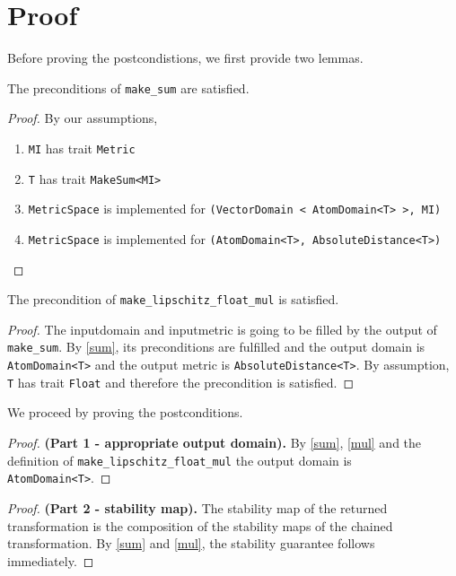\documentclass{article}
\begin{document}
\section{Proof}
Before proving the postcondistions, we first provide two lemmas.
\begin{lemma} \label{sum}
The preconditions of \texttt{make\_sum} are satisfied.
\end{lemma}
\begin{proof}
    By our assumptions,
    \begin{enumerate}
        \item \texttt{MI} has trait \texttt{Metric}
        \item \texttt{T} has trait \texttt{MakeSum<MI>}
        \item \texttt{MetricSpace} is implemented for \texttt{(VectorDomain < AtomDomain<T> >, MI)}
        \item \texttt{MetricSpace} is implemented for \texttt{(AtomDomain<T>, AbsoluteDistance<T>)}
    \end{enumerate} 
\end{proof}

\begin{lemma} \label{mul}
    The precondition of \texttt{make\_lipschitz\_float\_mul} is satisfied.
\end{lemma}

\begin{proof}
    The inputdomain and inputmetric is going to be filled by the output of \texttt{make\_sum}. By \ref{sum}, its preconditions are fulfilled and the output domain is \texttt{AtomDomain<T>} and the output metric is \texttt{AbsoluteDistance<T>}. By assumption, \texttt{T} has trait \texttt{Float} and therefore the precondition is satisfied.
\end{proof}

We proceed by proving the postconditions.

\begin{proof}
    \textbf{(Part 1 - appropriate output domain).}
    By \ref{sum}, \ref{mul} and the definition of \texttt{make\_lipschitz\_float\_mul} the output domain is \texttt{AtomDomain<T>}.
\end{proof}

\begin{proof}
    \textbf{(Part 2 - stability map).} 
    The stability map of the returned transformation is the composition of the stability maps of the chained transformation. By \ref{sum} and \ref{mul}, the stability guarantee follows immediately.
\end{proof}
\end{document}
